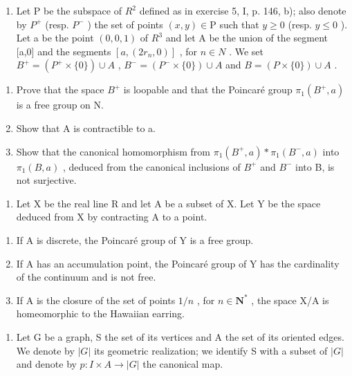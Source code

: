 \begin{enumerate}
\def\labelenumi{\arabic{enumi})}
\setcounter{enumi}{4}
\tightlist
\item
  Let P be the subspace of \(R^{2}\) defined as in exercise 5, I, p. 146, b); also denote by \(P^{+}\) (resp. \(P^{-}\) ) the set of points \((x,y)\in\mathrm{P}\) such that \(y\geqslant0\) (resp. \(y\leqslant0\) ). Let a be the point \((0,0,1)\) of \(R^{3}\) and let A be the union of the segment [a,0] and the segments \([a,(2r_{n},0)]\) , for \(n\in N\) . We set \(B^{+}=(P^{+}\times\{0\})\cup A\) , \(B^{-}=(P^{-}\times\{0\})\cup A\) and \(B=(P\times\{0\})\cup A\) .
\end{enumerate}

\begin{enumerate}
\def\labelenumi{\alph{enumi})}
\item
  Prove that the space \(B^{+}\) is loopable and that the Poincaré group \(\pi_{1}(B^{+}, a)\) is a free group on N.
\item
  Show that A is contractible to a.
\item
  Show that the canonical homomorphism from \(\pi_{1}(B^{+},a)*\pi_{1}(B^{-},a)\) into \(\pi_{1}(B,a)\) , deduced from the canonical inclusions of \(B^{+}\) and \(B^{-}\) into B, is not surjective.
\end{enumerate}

\begin{enumerate}
\def\labelenumi{\arabic{enumi})}
\setcounter{enumi}{5}
\tightlist
\item
  Let X be the real line R and let A be a subset of X. Let Y be the space deduced from X by contracting A to a point.
\end{enumerate}

\begin{enumerate}
\def\labelenumi{\alph{enumi})}
\item
  If A is discrete, the Poincaré group of Y is a free group.
\item
  If A has an accumulation point, the Poincaré group of Y has the cardinality of the continuum and is not free.
\item
  If A is the closure of the set of points \(1/n\) , for \(n \in \mathbf{N}^*\) , the space X/A is homeomorphic to the Hawaiian earring.
\end{enumerate}

\begin{enumerate}
\def\labelenumi{\arabic{enumi})}
\setcounter{enumi}{6}
\tightlist
\item
  Let G be a graph, S the set of its vertices and A the set of its oriented edges. We denote by \(|G|\) its geometric realization; we identify S with a subset of \(|G|\) and denote by \(p: I \times A \rightarrow |G|\) the canonical map.
\end{enumerate}

